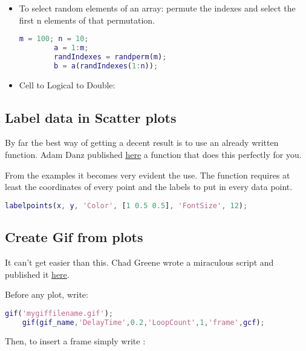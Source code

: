 \begin{itemize}
    \item To select random elements of an array: permute the indexes and select the first n elements of that permutation.
    \begin{lstlisting}[language=matlab]
        m = 100; n = 10;
        a = 1:m;
        randIndexes = randperm(m);
        b = a(randIndexes(1:n));
    \end{lstlisting}
    
    \item Cell to Logical to Double:
    \vspace{-.1cm}
\end{itemize}






\subsection{Label data in Scatter plots}
\par By far the best way of getting a decent result is to use an already written function. Adam Danz published \href{https://nl.mathworks.com/matlabcentral/fileexchange/46891-labelpoints}{\ul{here}} a function that does this perfectly for you. 

\par From the examples it becomes very evident the use. The function requires at least the coordinates of every point and the labels to put in every data point.

\begin{lstlisting}[language=matlab]
    labelpoints(x, y, 'Color', [1 0.5 0.5], 'FontSize', 12);
\end{lstlisting}






\subsection{Create Gif from plots}
\par It can't get easier than this. Chad Greene wrote a miraculous script and published it \href{https://nl.mathworks.com/matlabcentral/fileexchange/63239-gif}{\ul{here}}.

\par Before any plot, write:
\begin{lstlisting}[language=matlab]
    gif('mygiffilename.gif');
    gif(gif_name,'DelayTime',0.2,'LoopCount',1,'frame',gcf);
\end{lstlisting}
\par Then, to insert a frame simply write :

